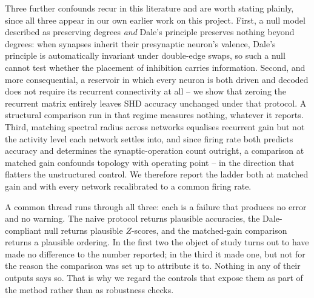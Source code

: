 Three further confounds recur in this literature and are worth stating plainly, since
all three appear in our own earlier work on this project. First, a null model described as
preserving degrees \emph{and} Dale's principle preserves nothing beyond degrees: when
synapses inherit their presynaptic neuron's valence, Dale's principle is automatically
invariant under double-edge swaps, so such a null cannot test whether the placement of
inhibition carries information. Second, and more consequential, a reservoir in which
every neuron is both driven and decoded does not require its recurrent connectivity at
all -- we show that zeroing the recurrent matrix entirely leaves SHD accuracy unchanged
under that protocol. A structural comparison run in that regime measures nothing,
whatever it reports. Third, matching spectral radius across networks equalises recurrent
gain but not the activity level each network settles into, and since firing rate both
predicts accuracy and determines the synaptic-operation count outright, a comparison at
matched gain confounds topology with operating point -- in the direction that flatters
the unstructured control. We therefore report the ladder both at matched gain and with
every network recalibrated to a common firing rate.

A common thread runs through all three: each is a failure that produces no error and no
warning. The naive protocol returns plausible accuracies, the Dale-compliant null returns
plausible $Z$-scores, and the matched-gain comparison returns a plausible ordering. In the
first two the object of study turns out to have made no difference to the number reported;
in the third it made one, but not for the reason the comparison was set up to attribute it
to. Nothing in any of their outputs says so. That is why we regard the controls that
expose them as part of the method rather than as robustness checks.

